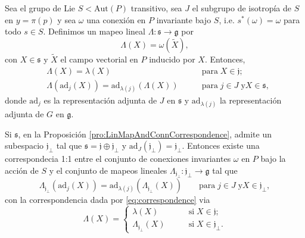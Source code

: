\begin{pro}
\label{pro:LinMapAndConnCorrespondence}
Sea el grupo de Lie $S < \mathrm{Aut} (P)$ transitivo, sea $J$ el subgrupo de isotrop\'{i}a de $S$ en $y = \pi(p)$ y sea $\omega$ una conexi\'{o}n en $P$ invariante bajo $S$, i.e. $s^{*}(\omega) = \omega$ para todo $s \in S$. Definimos un mapeo lineal $\Lambda: \mathfrak{s} \longrightarrow \mathfrak{g}$ por
%
\begin{equation}
\label{eq:correspondence}
\Lambda (X) = \omega (\tilde{X}),
\end{equation}
%
con $X \in \mathfrak{s}$ y $\tilde{X}$ el campo vectorial en $P$ inducido por $X$. Entonces,
%
\begin{align}
\label{eq:LambdaCond1}
& \Lambda (X) = \lambda (X) & \mathrm{para} \; X \in \mathfrak{j}; \\
\label{eq:LambdaCond2}
& \Lambda (\mathrm{ad}_{j} (X)) = \mathrm{ad}_{\lambda (j)} (\Lambda (X)) \qquad & \mathrm{para} \; j \in J \; \mathrm{y} X \in \mathfrak{s},
\end{align}
%
donde $\mathrm{ad}_{j}$ es la representaci\'{o}n adjunta de $J$ en $\mathfrak{s}$ y $\mathrm{ad}_{\lambda (j)}$ la representaci\'{o}n adjunta de $G$ en $\mathfrak{g}$.
\end{pro}


\begin{thm}
\label{thm:reductive}
Si $\mathfrak{s}$, en la Proposici\'{o}n \autoref{pro:LinMapAndConnCorrespondence}, admite un subespacio $\mathfrak{j}_{\perp}$ tal que $\mathfrak{s} = \mathfrak{j} \oplus \mathfrak{j}_{\perp}$ y $\mathrm{ad}_{J} (\mathfrak{j}_{\perp}) = \mathfrak{j}_{\perp}$. Entonces existe una correspondecia 1:1 entre el conjunto de conexiones invariantes $\omega$ en $P$ bajo la acci\'{o}n de $S$ y el conjunto de mapeos lineales $\Lambda_{\mathfrak{j}_{\perp}}: \mathfrak{j}_{\perp} \longrightarrow \mathfrak{g}$ tal que
%
\begin{equation}
\label{eq:HiggsField}
\Lambda_{\mathfrak{j}_{\perp}} (\mathrm{ad}_{j} (X)) = \mathrm{ad}_{\lambda (j)} (\Lambda_{\mathfrak{j}_{\perp}} (X)) \qquad \mathrm{para} \; j \in J \; \mathrm{y} X \in \mathfrak{j}_{\perp},
\end{equation}
%
con la correspondencia dada por \eqref{eq:correspondence} via
%
$$
\Lambda (X) = 
\begin{cases}
\lambda (X) \qquad & \mathrm{si} \; X\in \mathfrak{j}; \\
\Lambda_{\mathfrak{j}_{\perp}} (X) \qquad & \mathrm{si} \; X \in \mathfrak{j}_{\perp}.
\end{cases}
$$
%
\end{thm}

